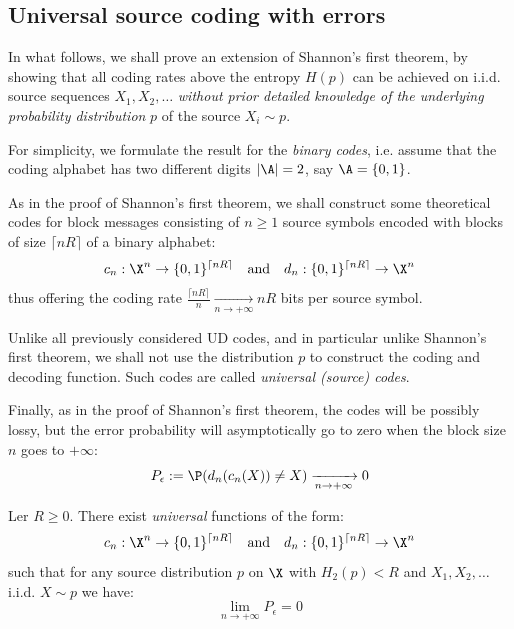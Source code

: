\documentclass[toc, titlepaged]{../cs-classes/cs-classes}
\begin{document}
\subsection{Universal source coding with errors}
In what follows, we shall prove an extension of Shannon's first theorem, by showing that all coding rates above the entropy $H(p)$ can be achieved on i.i.d. source sequences $X_1, X_2, \dots$ \emph{without prior detailed knowledge of the underlying probability distribution} $p$ of the source $X_i\sim p$.

For simplicity, we formulate the result for the \emph{binary codes}, i.e. assume that the coding alphabet has two different digits $|\A|=2$, say $\A=\{0, 1\}$.

As in the proof of Shannon's first theorem, we shall construct some theoretical codes for block messages consisting of $n\geq 1$ source symbols encoded with blocks of size $\lceil nR\rceil$ of a binary alphabet:
\begin{equation*}
    c_n:\X^n \rightarrow \{0, 1\}^{\lceil nR\rceil} \quad\textnormal{and}\quad d_n:\{0, 1\}^{\lceil nR\rceil} \rightarrow \X^n
\end{equation*}
thus offering the coding rate $\frac{\lceil nR\rceil}{n} \xrightarrow[n\to+\infty]{} nR$ bits per source symbol.

Unlike all previously considered UD codes, and in particular unlike Shannon's first theorem, we shall not use the distribution $p$ to construct the coding and decoding function. Such codes are called \emph{universal (source) codes}.

Finally, as in the proof of Shannon's first theorem, the codes will be possibly lossy, but the error probability will asymptotically go to zero when the block size $n$ goes to $+\infty$:
\begin{equation*}
    P_\epsilon := \P(d_n(c_n(X))\neq X) \xrightarrow[n\to+\infty]{} 0
\end{equation*}

\begin{theorem}
    Ler $R\geq 0$. There exist \emph{universal} functions of the form:
    \begin{equation*}
        c_n:\X^n \rightarrow \{0, 1\}^{\lceil nR\rceil} \quad\textnormal{and}\quad d_n:\{0, 1\}^{\lceil nR\rceil} \rightarrow \X^n
    \end{equation*}
    such that for any source distribution $p$ on $\X$ with $H_2(p)<R$ and $X_1, X_2, \dots$ i.i.d. $X\sim p$ we have:
    \begin{equation*}
        \lim_{n\to+\infty}P_\epsilon = 0
    \end{equation*}
\end{theorem}
\end{document}
